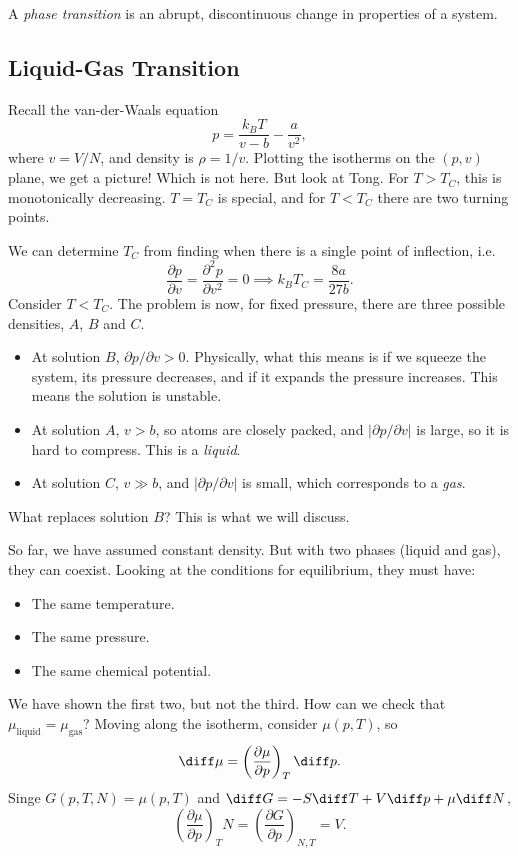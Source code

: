\documentclass[12pt]{article}
\begin{document}
A \emph{phase transition} is an abrupt, discontinuous change in properties of a system.

\subsection{Liquid-Gas Transition}
\label{sub:lgt}

Recall the van-der-Waals equation
\[
p = \frac{k_B T}{v - b} - \frac{a}{v^2},
\]
where $v = V/N$, and density is $\rho = 1/v$. Plotting the isotherms on the $(p, v)$ plane, we get a picture! Which is not here. But look at Tong. For $T > T_C$, this is monotonically decreasing. $T = T_C$ is special, and for $T < T_C$ there are two turning points.

We can determine $T_C$ from finding when there is a single point of inflection, i.e.
\[
\frac{\partial p}{\partial v} = \frac{\partial^2 p}{\partial v^2} = 0 \implies k_B T_C = \frac{8a}{27 b}.
\]
Consider $T < T_C$. The problem is now, for fixed pressure, there are three possible densities, $A$, $B$ and $C$.
\begin{itemize}
	\item At solution $B$, $\partial p/\partial v > 0$. Physically, what this means is if we squeeze the system, its pressure decreases, and if it expands the pressure increases. This means the solution is unstable.
	\item At solution $A$, $v > b$, so atoms are closely packed, and $|\partial p/\partial v|$ is large, so it is hard to compress. This is a \emph{liquid}.
	\item At solution $C$, $v \gg b$, and $|\partial p/\partial v|$ is small, which corresponds to a \emph{gas}.
\end{itemize}

What replaces solution $B$? This is what we will discuss.

So far, we have assumed constant density. But with two phases (liquid and gas), they can coexist. Looking at the conditions for equilibrium, they must have:
\begin{itemize}
	\item The same temperature.
	\item The same pressure.
	\item The same chemical potential.
\end{itemize}
We have shown the first two, but not the third. How can we check that $\mu_{\mathrm{liquid}} = \mu_{\mathrm{gas}}$? Moving along the isotherm, consider $\mu(p, T)$, so
\[
\diff \mu = \left( \frac{\partial \mu}{\partial p}\right)_T \diff p.
\]
Singe $G(p, T, N) = \mu(p, T)$ and $\diff G = - S \diff T + V \diff p + \mu \diff N$,
\[
\left( \frac{\partial \mu}{\partial p} \right)_T N = \left( \frac{\partial G}{\partial p} \right)_{N, T} = V.
\]
\end{document}
